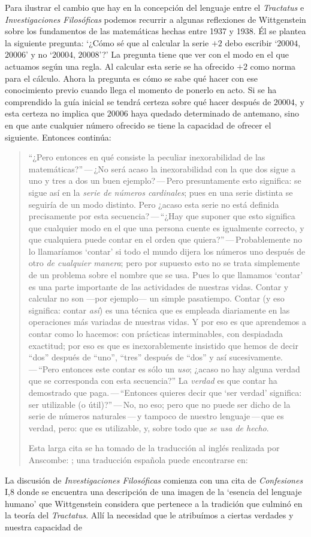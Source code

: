 Para ilustrar el cambio que hay en la concepción del lenguaje entre el \emph{Tractatus} e \emph{Investigaciones Filosóficas} podemos recurrir a algunas reflexiones de Wittgenstein sobre los fundamentos de las matemáticas hechas entre 1937 y 1938. Él se plantea la siguiente pregunta: \enquote*{¿Cómo sé que al calcular la serie $+2$ debo escribir `$20004$, $20006$' y no `$20004$, $20008$'?} La pregunta tiene que ver con el modo en el que actuamos según una regla. Al calcular esta serie se ha ofrecido $+2$ como norma para el cálculo. Ahora la pregunta es cómo se sabe qué hacer con ese conocimiento previo cuando llega el momento de ponerlo en acto. Si se ha comprendido la guía inicial se tendrá certeza sobre qué hacer después de $20004$, y esta certeza no implica que $20006$ haya quedado determinado de antemano, sino en que ante cualquier número ofrecido se tiene la capacidad de ofrecer el siguiente. Entonces continúa: \blockquote[Esta larga cita se ha tomado de la traducción al inglés realizada por Anscombe: {\cite[I, \S4]{wittgenstein1956remmath}}; una traducción española puede encontrarse en: {\cite[17--18]{wittgenstein1956remmathes}}]{``¿Pero entonces en qué consiste la peculiar inexorabilidad de las matemáticas?''\,---\,¿No será acaso la inexorabilidad con la que dos sigue a uno y tres a dos un buen ejemplo?\,---\,Pero presuntamente esto significa: se sigue así en la \emph{serie de números cardinales}; pues en una serie distinta se seguiría de un modo distinto. Pero ¿acaso esta serie no está definida precisamente por esta secuencia?\,---\,``¿Hay que suponer que esto significa que cualquier modo en el que una persona cuente es igualmente correcto, y que cualquiera puede contar en el orden que quiera?''\,---\,Probablemente no lo llamaríamos `contar' si todo el mundo dijera los números uno después de otro \emph{de cualquier manera}; pero por supuesto esto no se trata simplemente de un problema sobre el nombre que se usa. Pues lo que llamamos `contar' es una parte importante de las actividades de nuestras vidas. Contar y calcular no son ---por ejemplo--- un simple pasatiempo. Contar (y eso significa: contar \emph{así}) es una técnica que es empleada diariamente en las operaciones más variadas de nuestras vidas. Y por eso es que aprendemos a contar como lo hacemos: con prácticas interminables, con despiadada exactitud; por eso es que es inexorablemente insistido que hemos de decir ``dos'' después de ``uno'', ``tres'' después de ``dos'' y así sucesivamente.\,---\,``Pero entonces este contar es sólo un \emph{uso}; ¿acaso no hay alguna verdad que se corresponda con esta secuencia?'' La \emph{verdad} es que contar ha demostrado que paga.\,---\,``Entonces quieres decir que `ser verdad' significa: ser utilizable (o útil)?''\,---\,No, no eso; pero que no puede ser dicho de la serie de números naturales\,---\,y tampoco de nuestro lenguaje\,---\,que es verdad, pero: que es utilizable, y, sobre todo que \emph{se usa de hecho}.} La discusión de \emph{Investigaciones Filosóficas} comienza con una cita de \emph{Confesiones} I,8 donde se encuentra una descripción de una imagen de la `esencia del lenguaje humano' que Wittgenstein considera que pertenece a la tradición que culminó en la teoría del \emph{Tractatus}. Allí la necesidad que le atribuímos a ciertas verdades y nuestra capacidad de 